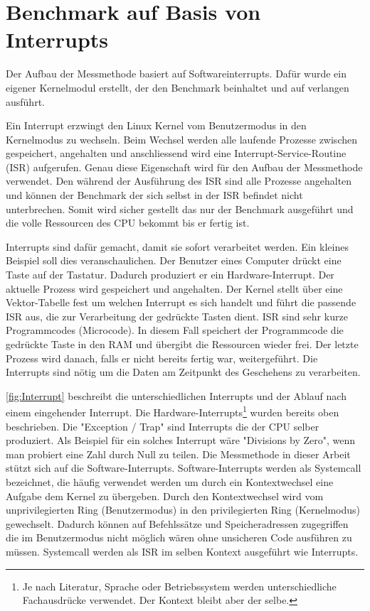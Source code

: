 
\section{Benchmark auf Basis von Interrupts}
\label{chap:benchmark_basis_interrupts}



Der Aufbau der Messmethode basiert auf Softwareinterrupts. Dafür wurde ein eigener Kernelmodul erstellt, der den Benchmark beinhaltet und auf verlangen ausführt.
\par
Ein Interrupt erzwingt den Linux Kernel vom Benutzermodus in den Kernelmodus zu wechseln\cite{Mandl2010_3}. Beim Wechsel werden alle laufende Prozesse zwischen gespeichert, angehalten und anschliessend wird eine Interrupt-Service-Routine (ISR) aufgerufen. Genau diese Eigenschaft wird für den Aufbau der Messmethode verwendet. Den während der Ausführung des ISR sind alle Prozesse angehalten und können der Benchmark der sich selbst in der ISR befindet nicht unterbrechen. Somit wird sicher gestellt das nur der Benchmark ausgeführt und die volle Ressourcen des CPU bekommt bis er fertig ist.
\par
Interrupts sind dafür gemacht, damit sie sofort verarbeitet werden. Ein kleines Beispiel soll dies veranschaulichen. Der Benutzer eines Computer drückt eine Taste auf der Tastatur. Dadurch produziert er ein Hardware-Interrupt. Der aktuelle Prozess wird gespeichert und angehalten. Der Kernel stellt über eine Vektor-Tabelle fest um welchen Interrupt es sich handelt und führt die passende ISR aus, die zur Verarbeitung der gedrückte Tasten dient. ISR sind sehr kurze Programmcodes (Microcode). In diesem Fall speichert der Programmcode die gedrückte Taste in den RAM und übergibt die Ressourcen wieder frei. Der letzte Prozess wird danach, falls er nicht bereits fertig war, weitergeführt. Die Interrupts sind nötig um die Daten am Zeitpunkt des Geschehens zu verarbeiten.
\par
\autoref{fig:Interrupt} beschreibt die unterschiedlichen Interrupts und der Ablauf nach einem eingehender Interrupt. Die Hardware-Interrupts\footnote{Je nach Literatur, Sprache oder Betriebssystem werden unterschiedliche Fachausdrücke verwendet. Der Kontext bleibt aber der selbe.} wurden bereits oben beschrieben. Die "Exception / Trap" sind Interrupts die der CPU selber produziert. Als Beispiel für ein solches Interrupt wäre "Divisions by Zero", wenn man probiert eine Zahl durch Null zu teilen. Die Messmethode in dieser Arbeit stützt sich auf die Software-Interrupts. Software-Interrupts werden als Systemcall bezeichnet, die häufig verwendet werden um durch ein Kontextwechsel eine Aufgabe dem Kernel zu übergeben. Durch den Kontextwechsel wird vom unprivilegierten Ring  (Benutzermodus) in den privilegierten Ring (Kernelmodus) gewechselt. Dadurch können auf Befehlssätze und Speicheradressen zugegriffen die im Benutzermodus nicht möglich wären ohne unsicheren Code ausführen zu müssen. Systemcall werden als ISR im selben Kontext ausgeführt wie Interrupts.

